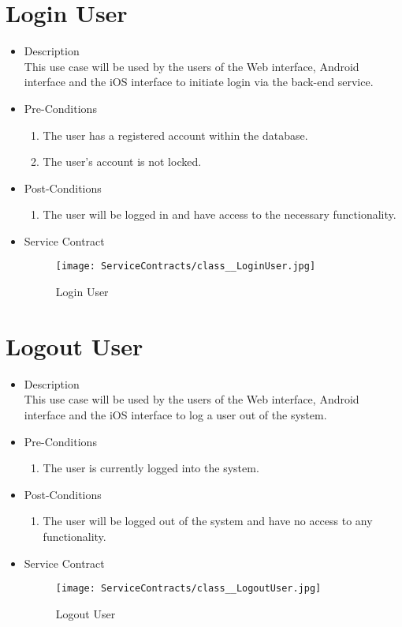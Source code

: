 \documentclass[11pt,fleqn]{book} %
\begin{document}
\section{Login User}
\begin{itemize}
	\item Description\\
	This use case will be used by the users of the Web interface, Android interface and the iOS interface to initiate login via the back-end service.
	\item Pre-Conditions
	\begin{enumerate}
		\item The user has a registered account within the database.
		\item The user’s account is not locked.
	\end{enumerate}
	\item Post-Conditions
	\begin{enumerate}
		\item The user will be logged in and have access to the necessary functionality.
	\end{enumerate}
	\item Service Contract
	\begin{figure}
		\texttt{[image: ServiceContracts/class\_\_LoginUser.jpg]}
		\caption{Login User}
	\end{figure}
\end{itemize}

\section{Logout User}
\begin{itemize}
	\item Description\\
	This use case will be used by the users of the Web interface, Android interface and the iOS interface to log a user out of the system.
	\item Pre-Conditions
	\begin{enumerate}
		\item The user is currently logged into the system.
	\end{enumerate}
	\item Post-Conditions
	\begin{enumerate}
		\item The user will be logged out of the system and have no access to any functionality.
	\end{enumerate}
	\item Service Contract
	\begin{figure}
		\texttt{[image: ServiceContracts/class\_\_LogoutUser.jpg]}
		\caption{Logout User}
	\end{figure}
\end{itemize}
\end{document}
